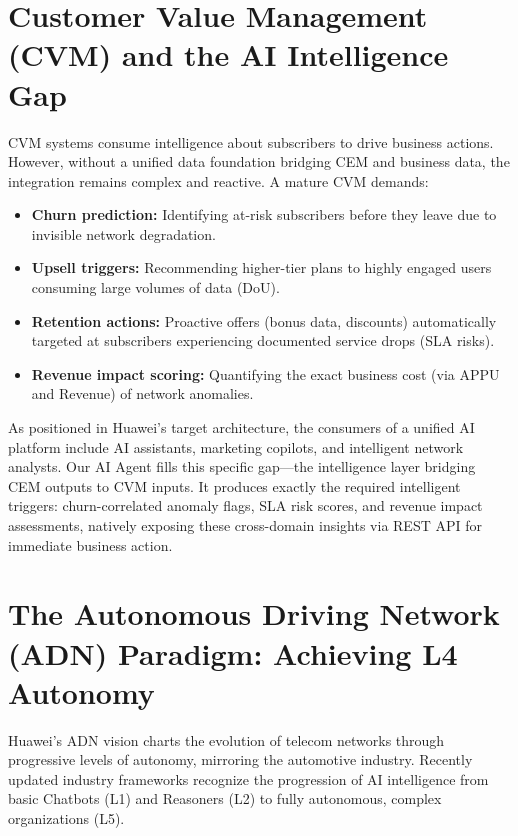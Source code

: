 \section{Customer Value Management (CVM) and the AI Intelligence Gap}

CVM systems consume intelligence about subscribers to drive business actions. However, without a unified data foundation bridging CEM and business data, the integration remains complex and reactive. A mature CVM demands:

\begin{itemize}
  \item \textbf{Churn prediction:} Identifying at-risk subscribers before they leave due to invisible network degradation.
  \item \textbf{Upsell triggers:} Recommending higher-tier plans to highly engaged users consuming large volumes of data (DoU).
  \item \textbf{Retention actions:} Proactive offers (bonus data, discounts) automatically targeted at subscribers experiencing documented service drops (SLA risks).
  \item \textbf{Revenue impact scoring:} Quantifying the exact business cost (via APPU and Revenue) of network anomalies.
\end{itemize}

As positioned in Huawei's target architecture, the consumers of a unified AI platform include AI assistants, marketing copilots, and intelligent network analysts. Our AI Agent fills this specific gap---the intelligence layer bridging CEM outputs to CVM inputs. It produces exactly the required intelligent triggers: churn-correlated anomaly flags, SLA risk scores, and revenue impact assessments, natively exposing these cross-domain insights via REST API for immediate business action.

\section{The Autonomous Driving Network (ADN) Paradigm: Achieving L4 Autonomy}

Huawei's ADN vision charts the evolution of telecom networks through progressive levels of autonomy, mirroring the automotive industry. Recently updated industry frameworks recognize the progression of AI intelligence from basic Chatbots (L1) and Reasoners (L2) to fully autonomous, complex organizations (L5). 


